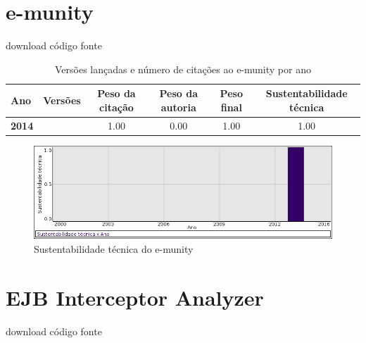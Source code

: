 \section{e-munity}
\checkmark download
\checkmark código fonte


\begin{table}[H]
\caption{Versões lançadas e número de citações ao e-munity por ano}
\centering
\begin{tabular}{| l | c | c | c | c | c |}
  \hline
  Ano & Versões & Peso da citação & Peso da autoria & Peso final & Sustentabilidade técnica \\
  \hline
            {\bf 2014}
          &
          
          &
          1.00
          &
          0.00
          &
          1.00
          &
            {\color{blue} 1.00}
          \\
\hline
\end{tabular}
\end{table}

\begin{figure}[h]
  \center
  \includegraphics[scale=0.50]{imagens/softwares-charts/e-munity.png}
  \caption{Sustentabilidade técnica do e-munity}
\end{figure}


\section{EJB Interceptor Analyzer}
\checkmark download
\checkmark código fonte


